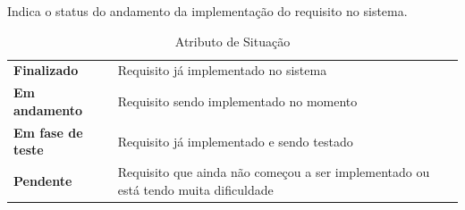   Indica o status do andamento da implementação do requisito no sistema.

  \begin{table}[!htb]
    \centering
    \begin{tabular}{p{5cm}p{10cm}}
      \toprule
      \textbf{Finalizado}       & Requisito já implementado no sistema                                                \\
      \textbf{Em andamento}     & Requisito sendo implementado no momento                                             \\
      \textbf{Em fase de teste} & Requisito já implementado e sendo testado                                           \\
      \textbf{Pendente}         & Requisito que ainda não começou a ser implementado ou está tendo muita dificuldade  \\
      \bottomrule
    \end{tabular}
    \caption{Atributo de Situação}
  \end{table}

